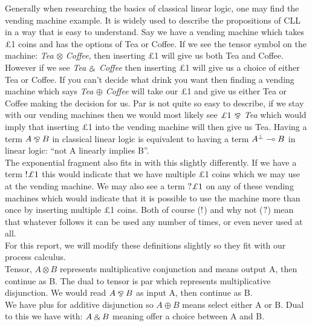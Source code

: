 \noindent
Generally when researching the basics of classical linear logic, one may find the vending machine example. It is 
widely used to describe the propositions of CLL in a way that is easy to understand. Say we have a vending machine 
which takes \pounds 1 coins and has the options of Tea or Coffee. If we see the tensor symbol on the machine: \emph{Tea} 
$\otimes$ \emph{Coffee}, then inserting \pounds 1 will give us both Tea and Coffee. However if we see \emph{Tea} $\mathbin{\binampersand}$ \emph{Coffee} then 
inserting \pounds 1 will give us a choice of either Tea or Coffee. If you can't decide what drink you want then finding a 
vending machine which says \emph{Tea} $\oplus$ \emph{Coffee} will take our \pounds 1 and give us either Tea or Coffee making the decision 
for us. Par is not quite so easy to describe, if we stay with our vending machines then we would most likely see 
$\pounds 1 \ \parr$ \emph{Tea} which would imply that inserting \pounds 1 into the vending machine will then give us Tea. 
Having a term $A \mathbin{\bindnasrepma} B$ in classical linear logic is equivalent to having a term $\negg{A} \multimap B$ in linear logic:
``not A linearly implies B''. \\

\noindent
The exponential fragment also fits in with this slightly differently. If we have a term $\ofc \pounds 1$ this would indicate 
that we have multiple \pounds 1 coins which we may use at the vending machine. We may also see a term $\whynot \pounds 1$ 
on any of these vending machines which would indicate that it is possible to use the machine more than once by inserting 
multiple \pounds 1 coins. Both of course ($\textrm{!}$) and why not ($\textrm{?}$) mean that whatever follows it can be used any 
number of times, or even never used at all. \\

\noindent
For this report, we will modify these definitions slightly so they fit with our process calculus. \\

\noindent
Tensor, $A \otimes B$ represents multiplicative conjunction and means output A, then continue as B. The dual to tensor 
is par which represents multiplicative disjunction. We would read $A \mathbin{\bindnasrepma} B$ as input A, then continue as B. \\

\noindent
We have plus for additive disjunction so $A \oplus B$ means select either A or B.  Dual to this we have with: 
$A \mathbin{\binampersand} B$ meaning offer a choice between A and B. \\

